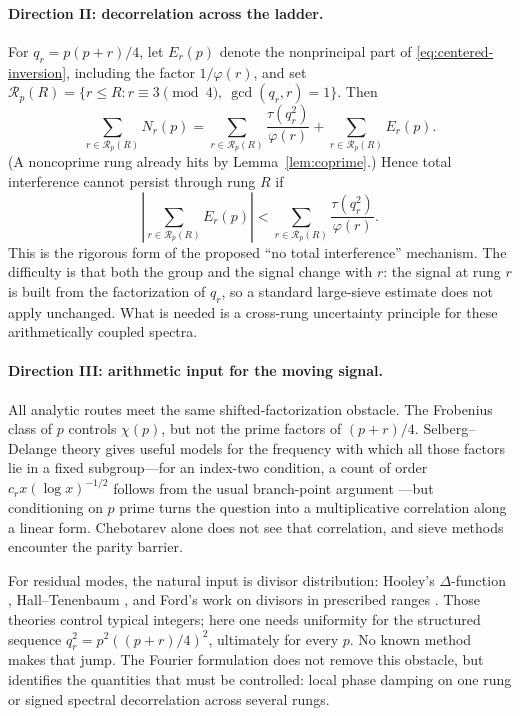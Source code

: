 \documentclass[11pt]{article}
\theoremstyle{definition}
\theoremstyle{remark}
\begin{document}
\paragraph{Direction II: decorrelation across the ladder.}
For $q_r=p(p+r)/4$, let $E_r(p)$ denote the nonprincipal part of
\eqref{eq:centered-inversion}, including the factor $1/\varphi(r)$, and set
$\mathcal R_p(R)=\{r\leq R:r\equiv3\pmod4,\ \gcd(q_r,r)=1\}$. Then
\begin{equation}\label{eq:ladder-interference}
 \sum_{r\in\mathcal R_p(R)}N_r(p)
 =\sum_{r\in\mathcal R_p(R)}
   \frac{\tau(q_r^2)}{\varphi(r)}
 +\sum_{r\in\mathcal R_p(R)}E_r(p).
\end{equation}
(A noncoprime rung already hits by Lemma~\ref{lem:coprime}.) Hence total interference
cannot persist through rung $R$ if
\[
 \left|\sum_{r\in\mathcal R_p(R)}E_r(p)\right|
 <\sum_{r\in\mathcal R_p(R)}\frac{\tau(q_r^2)}{\varphi(r)}.
\]
This is the rigorous form of the proposed ``no total interference'' mechanism. The
difficulty is that both the group and the signal change with $r$: the signal at rung
$r$ is built from the factorization of $q_r$, so a standard large-sieve estimate does
not apply unchanged. What is needed is a cross-rung uncertainty principle
for these arithmetically coupled spectra.

\paragraph{Direction III: arithmetic input for the moving signal.}
All analytic routes meet the same shifted-factorization obstacle. The Frobenius class
of $p$ controls $\chi(p)$, but not the prime factors of $(p+r)/4$. Selberg--Delange
theory gives useful models for the frequency with which all those factors lie in a
fixed subgroup---for an index-two condition, a count of order
$c_rx(\log x)^{-1/2}$ follows from the usual branch-point argument
\cite[Ch.~II.5]{Tenenbaum2015}---but conditioning on $p$ prime turns the question into a
multiplicative correlation along a linear form. Chebotarev alone does not see that
correlation, and sieve methods encounter the parity barrier.

For residual modes, the natural input is divisor distribution: Hooley's
$\Delta$-function \cite{Hooley1979}, Hall--Tenenbaum \cite{HallTenenbaum1988}, and
Ford's work on divisors in prescribed ranges \cite{Ford2008}. Those theories control
typical integers; here one needs uniformity for the structured sequence
$q_r^2=p^2((p+r)/4)^2$, ultimately for every $p$. No known method makes that jump. The
Fourier formulation does not remove this obstacle, but identifies the quantities that
must be controlled: local phase damping on one rung or signed spectral decorrelation
across several rungs.
\end{document}
